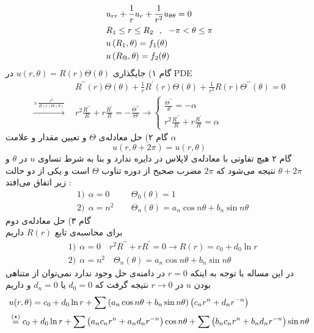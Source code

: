 \[\begin{aligned}
	& u_{rr}+\frac1r u_r+\frac1{r^2}u_{\theta\theta}=0
	\\ &
	R_1\le r \le R_2 \ \ , \ \ -\pi<\theta\le\pi
	\\ &
	u\left(R_1,\theta\right)=f_1(\theta)
	\\ &
	u\left(R_@,\theta\right)=f_2(\theta)
\end{aligned}\]
گام ۱) جایگذاری
$u(r,\theta)=R(r)\Theta(\theta)$
در PDE
\[\begin{aligned}
	& R^{\prime\prime}(r)\Theta(\theta)+\frac1r R^\prime(r)\Theta(\theta)+\frac1{r^2} R(r)\Theta^{\prime\prime}(\theta)=0
	\\ \xrightarrow{\times \frac{r^2}{R(r)\Theta(\theta)}} \ \ &
	r^2\frac{R^{\prime\prime}}R+r\frac{R^\prime}{R}=-\frac{\Theta^{\prime\prime}}\Theta\rightarrow\begin{cases}
		\frac{\Theta^{\prime\prime}}\theta=-\alpha
		\\
		r^2\frac{R^{\prime\prime}}R+r\frac{R^\prime}R=\alpha
	\end{cases}
\end{aligned}\]
گام ۲) حل معادله‌ی
$\Theta$
و تعیین مقدار و علامت
$\alpha$
\[
u(r,\theta+2\pi)=u(r,\theta)
\]
گام ۲ هیچ تفاوتی با معادله‌ی لاپلاس در دایره ندارد و بنا به شرط تساوی
$u$
در
$\theta$
و
$\theta+2\pi$
نتیجه می‌شود که
$2\pi$
مضرب صحیح از دوره تناوب
$\Theta$
است و یکی از دو حالت زیر اتفاق می‌افتد :
\[\begin{aligned}
	& 1)\ \ \alpha=0 \quad &\ \Theta_0(\theta)=1\\
	& 2) \ \ \alpha=n^2 \quad &\ \Theta_n(\theta)=a_n\cos{n\theta}+b_n\sin{n\theta}
\end{aligned}\]
گام ۳) حل معادله‌ی دوم\\
برای محاسبه‌ی تابع
$R(r)$
داریم
\[\begin{aligned}
	&
	1) \ \ \alpha=0 \quad r^2R^{\prime\prime}+rR^\prime=0\rightarrow R(r)=c_0+d_0\ln{r}
	\\ &
	2) \ \ \alpha=n^2\quad \Theta_n(\theta)=a_n\cos{n\theta}+b_n\sin{n\theta}
\end{aligned}\]
در این مساله با توجه به اینکه
$r=0$
در دامنه‌ی حل وجود ندارد نمی‌توان از متناهی بودن
$u$
در
$r\to0$
نتیجه گرفت که
$d_0=0$
یا
$d_n=0$
و داریم
\[\begin{aligned}
	& u(r,\theta)=c_0+d_0\ln r+\sum\left(a_n\cos{n\theta}+b_n\sin{n\theta}\right)\left(c_nr^n+d_nr^{-n}\right)
	\\ &
	\stackrel{(\star)}{=}c_0+d_0\ln r+\sum\left(a_nc_nr^n+a_nd_nr^{-n}\right)\cos{n\theta}+\sum\left(b_nc_nr^n+b_nd_nr^{-n}\right)\sin{n\theta}
\end{aligned}\]
